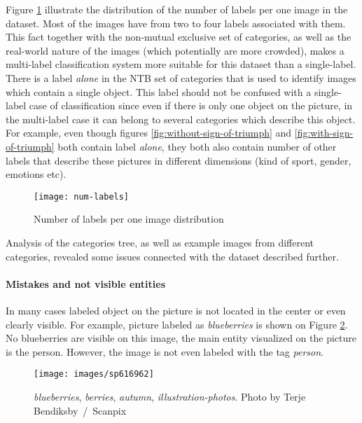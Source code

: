 Figure \ref{fig:num-labels} illustrate the distribution of the number of labels per one image in the dataset. Most of the images have from two to four labels associated with them. This fact together with the non-mutual exclusive set of categories, as well as the real-world nature of the images (which potentially are more crowded), makes a multi-label classification system more suitable for this dataset than a single-label. There is a label \textit{alone} in the NTB set of categories that is used to identify images which contain a single object. This label should not be confused with a single-label case of classification since even if there is only one object on the picture, in the multi-label case it can belong to several categories which describe this object. For example, even though figures \ref{fig:without-sign-of-triumph} and \ref{fig:with-sign-of-triumph} both contain label \textit{alone}, they both also contain number of other labels that describe these pictures in different dimensions (kind of sport, gender, emotions etc).

\begin{figure}[h!]
    \centering
    \texttt{[image: num-labels]}
    \caption{Number of labels per one image distribution}
    \label{fig:num-labels}
\end{figure}

Analysis of the categories tree, as well as example images from different categories, revealed some issues connected with the dataset described further.

\paragraph{Mistakes and not visible entities}
In many cases labeled object on the picture is not located in the center or even clearly visible. For example, picture labeled as \textit{blueberries} is shown on Figure \ref{fig:image-blueberries}. No blueberries are visible on this image, the main entity visualized on the picture is the person. However, the image is not even labeled with the tag \textit{person}.

\begin{figure}[h]
    \centering
    \texttt{[image: images/sp616962]}
    \caption[Example picture from the \textit{blueberries} category]{\textit{blueberries}, \textit{berries}, \textit{autumn}, \textit{illustration-photos}. Photo by Terje Bendiksby~/~Scanpix}
    \label{fig:image-blueberries}
\end{figure}

